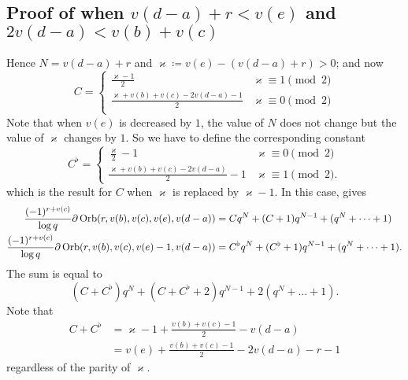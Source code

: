 \subsection{Proof of 
  when $v(d-a)+r < v(e)$ and $2v(d-a) < v(b)+v(c)$}
Hence $N = v(d-a) + r$ and $\varkappa \coloneqq v(e) - (v(d-a)+r) > 0$; and now
\[
  C = \begin{cases}
    \frac{\varkappa-1}{2} & \varkappa \equiv 1 \pmod 2\\
    \frac{\varkappa+v(b)+v(c)-2v(d-a)-1}{2} & \varkappa \equiv 0 \pmod 2 \\
  \end{cases}
\]
Note that when $v(e)$ is decreased by $1$,
the value of $N$ does not change but the value of $\varkappa$ changes by $1$.
So we have to define the corresponding constant
\[
  C^\flat = \begin{cases}
    \frac{\varkappa}{2}-1 & \varkappa \equiv 0 \pmod 2\\
    \frac{\varkappa+v(b)+v(c)-2v(d-a)}{2}-1 & \varkappa \equiv 1 \pmod 2.
  \end{cases}
\]
which is the result for $C$ when $\varkappa$ is replaced by $\varkappa-1$.
In this case,  gives
\begin{align*}
  \frac{(-1)^{r+v(c)}}{\log q}\partial\operatorname{Orb}(r, v(b), v(c), v(e), v(d-a))
  &= C q^N + (C+1) q^{N-1} + (q^N + \dots + 1) \\
  \frac{(-1)^{r+v(c)}}{\log q}\partial\operatorname{Orb}(r, v(b), v(c), v(e)-1, v(d-a))
  &= C^\flat q^N + (C^\flat+1) q^{N-1} + (q^N + \dots + 1).
\end{align*}
The sum is equal to
\[ (C + C^\flat) q^N + (C+C^\flat+2) q^{N-1} + 2(q^N + \dots + 1). \]
Note that
\begin{align*}
  C + C^\flat
  &= \varkappa - 1 + \frac{v(b)+v(c)-1}{2} - v(d-a) \\
  &= v(e) + \frac{v(b)+v(c)-1}{2} - 2v(d-a) - r - 1
\end{align*}
regardless of the parity of $\varkappa$.

